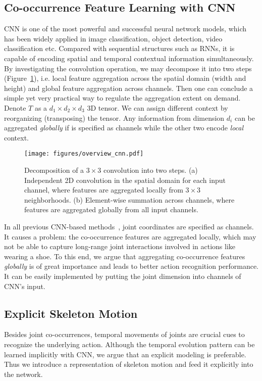 \documentclass{article}
\begin{document}
\subsection{Co-occurrence Feature Learning with CNN}
\label{sec:global-co-occur}

CNN is one of the most powerful and successful neural network models, which has been widely applied in image classification, object detection, video classification etc. Compared with sequential structures such as RNNs, it is capable of encoding spatial and temporal contextual information simultaneously. By investigating the convolution operation, we may decompose it into two steps (Figure~\ref{fig:cnn_structure}), i.e. local feature aggregation across the spatial domain (width and height) and global feature aggregation across channels. Then one can conclude a simple yet very practical way to regulate the aggregation extent on demand. Denote $T$ as a $d_{1}\times d_{2}\times d_{3}$ 3D tensor. We can assign different context by reorganizing (transposing) the tensor. Any information from dimension $d_{i}$ can be aggregated \emph{globally} if is specified as channels while the other two encode \emph{local} context.

\begin{figure}[tbp]
  \centering
  \texttt{[image: figures/overview\_cnn.pdf]}
  \caption{Decomposition of a $3\times 3$ convolution into two steps. (a) Independent 2D convolution in the spatial domain for each input channel, where features are aggregated locally from $3\times 3$ neighborhoods. (b) Element-wise summation across channels, where features are aggregated globally from all input channels.}
  \label{fig:cnn_structure}
\end{figure}

In all previous CNN-based methods~\cite{Du2016Skeleton,Ke_2017_CVPR,Li_2017_ICMEW}, joint coordinates are specified as channels. It causes a problem: the co-occurrence features are aggregated locally, which may not be able to capture long-range joint interactions involved in actions like wearing a shoe. To this end, we argue that aggregating co-occurrence features \emph{globally} is of great importance and leads to better action recognition performance. It can be easily implemented by putting the joint dimension into channels of CNN's input.

\subsection{Explicit Skeleton Motion}
Besides joint co-occurrences, temporal movements of joints are crucial cues to recognize the underlying action. Although the temporal evolution pattern can be learned implicitly with CNN, we argue that an explicit modeling is preferable. Thus we introduce a representation of skeleton motion and feed it explicitly into the network.
\end{document}
